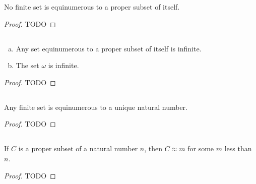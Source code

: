 \documentclass{report}
\begin{document}
  \begin{corollary}[6C]
    No finite set is equinumerous to a proper subset of itself.
  \end{corollary}

  \begin{proof}
    TODO
  \end{proof}

\subsection{}%

  \begin{corollary}[6D]
    \begin{enumerate}[(a)]
      \item Any set equinumerous to a proper subset of itself is infinite.
      \item The set $\omega$ is infinite.
    \end{enumerate}
  \end{corollary}

  \begin{proof}
    TODO
  \end{proof}

\subsection{}%

  \begin{corollary}[6E]
    Any finite set is equinumerous to a unique natural number.
  \end{corollary}

  \begin{proof}
    TODO
  \end{proof}

\subsection{}%

  \begin{lemma}[6F]
    If $C$ is a proper subset of a natural number $n$, then $C \approx m$ for
      some $m$ less than $n$.
  \end{lemma}

  \begin{proof}
    TODO
  \end{proof}
\end{document}
